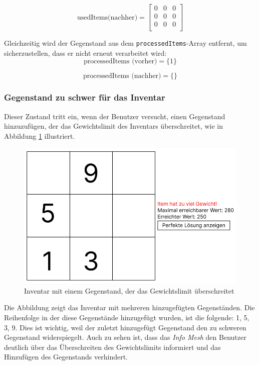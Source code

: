 \[
    \text{usedItems(nachher)} =
    \left[
        \begin{array}{ccccc}
            0 & 0 & 0 \\
            0 & 0 & 0 \\
            0 & 0 & 0 \\
        \end{array}
        \right]
\]

Gleichzeitig wird der Gegenstand aus dem \texttt{processedItems}-Array entfernt, um sicherzustellen, dass er nicht erneut
verarbeitet wird:
\[
    \text{processedItems (vorher)} = \{1\}
\]

\[
    \text{processedItems (nachher)} = \{\}
\]

\subsubsection*{Gegenstand zu schwer für das Inventar}
Dieser Zustand tritt ein, wenn der Benutzer versucht, einen Gegenstand hinzuzufügen, der das Gewichtslimit des Inventars
überschreitet, wie in Abbildung \ref{fig:controller_itemTooHeavy} illustriert.

\begin{figure}[H]
    \centering
    \includegraphics[scale=0.5]{images/itemToHeavy}
    \caption{Inventar mit einem Gegenstand, der das Gewichtslimit überschreitet}
    \label{fig:controller_itemTooHeavy}
\end{figure}

Die Abbildung zeigt das Inventar mit mehreren hinzugefügten Gegenständen. Die Reihenfolge in der diese Gegenstände
hinzugefügt wurden, ist die folgende: 1, 5, 3, 9. Dies ist wichtig, weil der zuletzt hinzugefügt Gegenstand den zu schweren
Gegenstand widerspiegelt. Auch zu sehen ist, dass das \textit{Info Mesh} den Benutzer deutlich über das Überschreiten des 
Gewichtslimits informiert und das Hinzufügen des Gegenstands verhindert.

